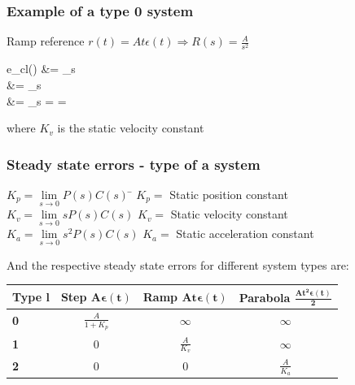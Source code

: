 \begin{frame}
	\frametitle{Example of a type 0 system}
		\begin{example}
			{Ramp reference $r(t) = At \epsilon (t) \Rightarrow R(s) = \frac{A}{s^2}$}
			\begin{flalign*}
				e_{cl}(\infty) &= \lim\limits_{s }   \\
				&= \lim\limits_{s }   \\
				&= \lim\limits_{s }  =  = \infty
			\end{flalign*}
			where $K_v$ is the static velocity constant
		\end{example}
\end{frame}	

\begin{frame}
	\frametitle{Steady state errors - type of a system}
	\begin{block}{}
			\begin{tabbing}
			$K_p = \lim\limits_{s \rightarrow 0} P(s)C(s)$ 
			\hspace{2em} \= $K_p = $ Static position constant \\
			$K_v = \lim\limits_{s \rightarrow 0}s P(s)C(s)$ \> $K_v = $ Static velocity constant \\
			$K_a = \lim\limits_{s \rightarrow 0}s^2 P(s)C(s)$ \> $K_a = $ Static acceleration constant
			\end{tabbing}
		\end{block}
	\begin{alertblock}{}
		And the respective steady state errors for different system types are:
		\begin{tabular}{|l|c|c|c|}
			\hline \textbf{Type} $\mathbf{l}$ & \textbf{Step} $\mathbf{A \boldsymbol{\epsilon} (t)}$ & \textbf{Ramp} $\mathbf{At \boldsymbol{\epsilon} (t)}$ & \textbf{Parabola} $\mathbf{\frac{At^2 \boldsymbol{\epsilon} (t)}{2}}$ \\ 
			\hline \textbf{0} & $\frac{A}{1 + K_p}$ & $\infty$ & $\infty$ \\ 
			\hline \textbf{1} & 0 & $\frac{A}{K_v}$ & $\infty$ \\ 
			\hline \textbf{2} & 0 & 0 & $\frac{A}{K_a}$ \\ 
			\hline 
		\end{tabular} 
	\end{alertblock}
\end{frame}


